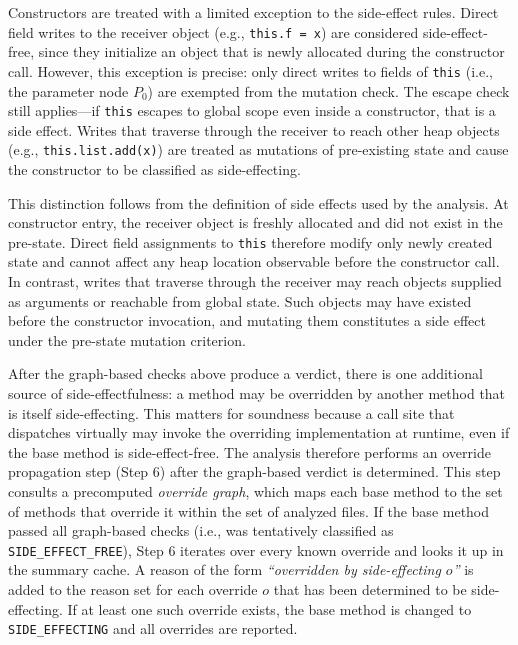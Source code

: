 Constructors are treated with a limited exception to the side-effect rules. Direct field writes to the receiver object (e.g., \texttt{this.f = x}) are considered side-effect-free, since they initialize an object that is newly allocated during the constructor call. However, this exception is precise: only direct writes to fields of \texttt{this} (i.e., the parameter node $P_0$) are exempted from the mutation check. The escape check still applies---if \texttt{this} escapes to global scope even inside a constructor, that is a side effect. Writes that traverse through the receiver to reach other heap objects (e.g., \texttt{this.list.add(x)}) are treated as mutations of pre-existing state and cause the constructor to be classified as side-effecting.

This distinction follows from the definition of side effects used by the analysis. At constructor entry, the receiver object is freshly allocated and did not exist in the pre-state. Direct field assignments to \texttt{this} therefore modify only newly created state and cannot affect any heap location observable before the constructor call. In contrast, writes that traverse through the receiver may reach objects supplied as arguments or reachable from global state. Such objects may have existed before the constructor invocation, and mutating them constitutes a side effect under the pre-state mutation criterion.

After the graph-based checks above produce a verdict, there is one additional source of side-effectfulness: a method may be overridden by another method that is itself side-effecting. This matters for soundness because a call site that dispatches virtually may invoke the overriding implementation at runtime, even if the base method is side-effect-free. The analysis therefore performs an override propagation step (Step 6) after the graph-based verdict is determined. This step consults a precomputed \emph{override graph}, which maps each base method to the set of methods that override it within the set of analyzed files. If the base method passed all graph-based checks (i.e., was tentatively classified as \texttt{SIDE\_EFFECT\_FREE}), Step 6 iterates over every known override and looks it up in the summary cache. A reason of the form \emph{``overridden by side-effecting $o$''} is added to the reason set for each override $o$ that has been determined to be side-effecting. If at least one such override exists, the base method is changed to \texttt{SIDE\_EFFECTING} and all overrides are reported.


